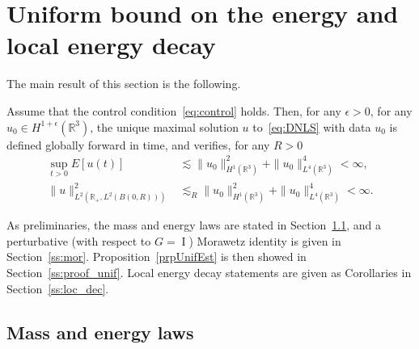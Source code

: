 \documentclass[10pt]{amsart}
\theoremstyle{definition}\newtheorem{defi}[theo]{Definition}\newtheorem{rema}[theo]{Remark}\newtheorem{exam}[theo]{Example}\newtheorem{exem}[theo]{Example}\newtheorem{nota}[theo]{Notation}
\newcommand*\R{\mathbb{R}}
\DeclareMathOperator{\I}{I}
\begin{document}
\section{Uniform bound on the energy and local energy decay}\label{s:nrj}
The main result of this section is the following.

\begin{prop}\label{prpUnifEst}
Assume that the control condition~\eqref{eq:control} holds. Then, for any $\epsilon>0$, for any $u_0 \in H^{1+\epsilon}(\R^3)$, the unique maximal solution $u$ to~\eqref{eq:DNLS} with data $u_0$ is defined globally forward in time, and verifies, for any $R>0$
\begin{align*}
\sup_{t>0} E[u(t)] &\lesssim \| u_0 \|_{H^1(\R^3)}^2 + \| u_0 \|_{L^4(\R^3)}^4 < \infty, \\
\| u \|^2_{L^2(\R_+, L^2(B(0,R)))} &\lesssim_R \| u_0 \|_{H^1(\R^3)}^2 + \| u_0 \|_{L^4(\R^3)}^4 < \infty.
\end{align*}
\end{prop}

As preliminaries, the mass and energy laws are stated in Section~\ref{ss:laws}, and a perturbative (with respect to $G = \I $) Morawetz identity is given in Section~\ref{ss:mor}. Proposition~\ref{prpUnifEst} is then showed in Section~\ref{ss:proof_unif}. Local energy decay statements are given as Corollaries in Section~\ref{ss:loc_dec}.
\subsection{Mass and energy laws} \label{ss:laws}
\end{document}
